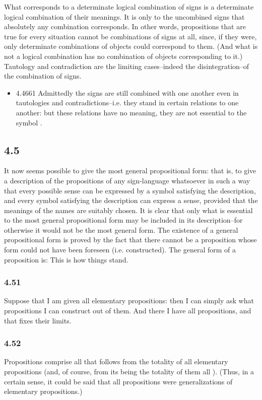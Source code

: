 \documentclass[11pt]{article}
\begin{document}
\begin{itemize}
\label{sec:orge539726}
What corresponds to a determinate logical combination of signs is a
determinate logical combination of their meanings. It is only to the
uncombined signs that absolutely any combination corresponds. In other
words, propositions that are true for every situation cannot be
combinations of signs at all, since, if they were, only determinate
combinations of objects could correspond to them. (And what is not a
logical combination has no combination of objects corresponding to it.)
Tautology and contradiction are the limiting cases--indeed the
disintegration--of the combination of signs.
\begin{itemize}
\item 4.4661
\label{sec:org44c6022}
Admittedly the signs are still combined with one another even in
tautologies and contradictions--i.e. they stand in certain relations to one
another: but these relations have no meaning, they are not essential to the
symbol .
\end{itemize}
\end{itemize}
\subsection*{4.5}
\label{sec:org98629f8}
It now seems possible to give the most general propositional form: that
is, to give a description of the propositions of any sign-language
whatsoever in such a way that every possible sense can be expressed by a
symbol satisfying the description, and every symbol satisfying the
description can express a sense, provided that the meanings of the names
are suitably chosen. It is clear that only what is essential to the most
general propositional form may be included in its description--for
otherwise it would not be the most general form. The existence of a general
propositional form is proved by the fact that there cannot be a proposition
whose form could not have been foreseen (i.e. constructed). The general
form of a proposition is: This is how things stand.
\subsubsection*{4.51}
\label{sec:org9edc601}
Suppose that I am given all elementary propositions: then I can simply
ask what propositions I can construct out of them. And there I have all
propositions, and that fixes their limits.
\subsubsection*{4.52}
\label{sec:orga19241c}
Propositions comprise all that follows from the totality of all
elementary propositions (and, of course, from its being the totality of
them all ). (Thus, in a certain sense, it could be said that all
propositions were generalizations of elementary propositions.)
\end{document}
